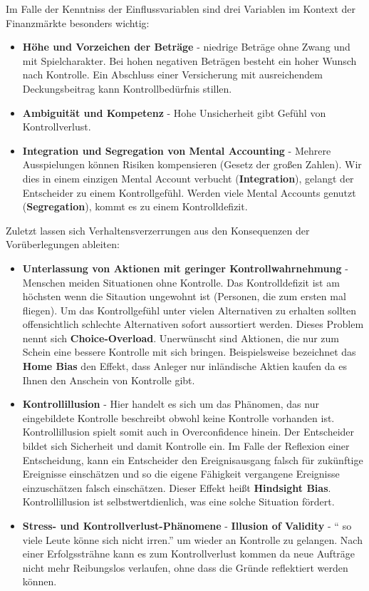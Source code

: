 Im Falle der Kenntniss der Einflussvariablen sind drei Variablen
im Kontext der Finanzmärkte besonders wichtig:
\begin{itemize}
    \item \textbf{Höhe und Vorzeichen der Beträge} - niedrige Beträge ohne Zwang und mit
        Spielcharakter. Bei hohen negativen Beträgen besteht ein hoher Wunsch
        nach Kontrolle. Ein Abschluss einer Versicherung mit ausreichendem
        Deckungsbeitrag kann Kontrollbedürfnis stillen.
    \item \textbf{Ambiguität und Kompetenz} -
        Hohe Unsicherheit gibt Gefühl von Kontrollverlust.
    \item \textbf{Integration und Segregation von Mental Accounting} - Mehrere
        Ausspielungen können Risiken kompensieren (Gesetz der großen Zahlen).
        Wir dies in einem einzigen Mental Account verbucht
        (\textbf{Integration}), gelangt der Entscheider
        zu einem Kontrollgefühl. Werden viele Mental Accounts genutzt
        (\textbf{Segregation}), kommt es zu einem Kontrolldefizit.
\end{itemize}

Zuletzt lassen sich Verhaltensverzerrungen aus den Konsequenzen
der Vorüberlegungen ableiten:
\begin{itemize}
    \item \textbf{Unterlassung von Aktionen mit geringer Kontrollwahrnehmung}
        - Menschen meiden Situationen ohne Kontrolle. Das Kontrolldefizit ist
        am höchsten wenn die Sitaution ungewohnt ist (Personen, die zum ersten
        mal fliegen). Um das Kontrollgefühl unter vielen Alternativen zu erhalten
        sollten offensichtlich schlechte Alternativen sofort aussortiert werden.
        Dieses Problem nennt sich \textbf{Choice-Overload}. Unerwünscht sind
        Aktionen, die nur zum Schein eine bessere Kontrolle mit sich bringen.
        Beispielsweise bezeichnet das \textbf{Home Bias} den Effekt, dass
        Anleger nur inländische Aktien kaufen da es Ihnen den Anschein von Kontrolle
        gibt.
    \item \textbf{Kontrollillusion} - Hier handelt es sich um das Phänomen, das
        nur eingebildete Kontrolle beschreibt obwohl keine Kontrolle
        vorhanden ist. Kontrollillusion spielt somit auch in
        Overconfidence hinein. Der Entscheider bildet sich Sicherheit und damit
        Kontrolle ein. Im Falle der Reflexion einer Entscheidung, kann ein
        Entscheider den Ereignisausgang falsch für zukünftige Ereignisse
        einschätzen und so die eigene Fähigkeit vergangene Ereignisse einzuschätzen
        falsch einschätzen. Dieser Effekt heißt \textbf{Hindsight Bias}.
        Kontrollillusion ist selbstwertdienlich, was eine solche Situation
        fördert.
    \item \textbf{Stress- und Kontrollverlust-Phänomene}
        - \textbf{Illusion of Validity} - `` so viele Leute könne sich
        nicht irren.'' um wieder an Kontrolle zu gelangen.
        Nach einer Erfolgssträhne kann es zum Kontrollverlust kommen da
        neue Aufträge nicht mehr Reibungslos verlaufen, ohne dass die Gründe
        reflektiert werden können.
\end{itemize}

